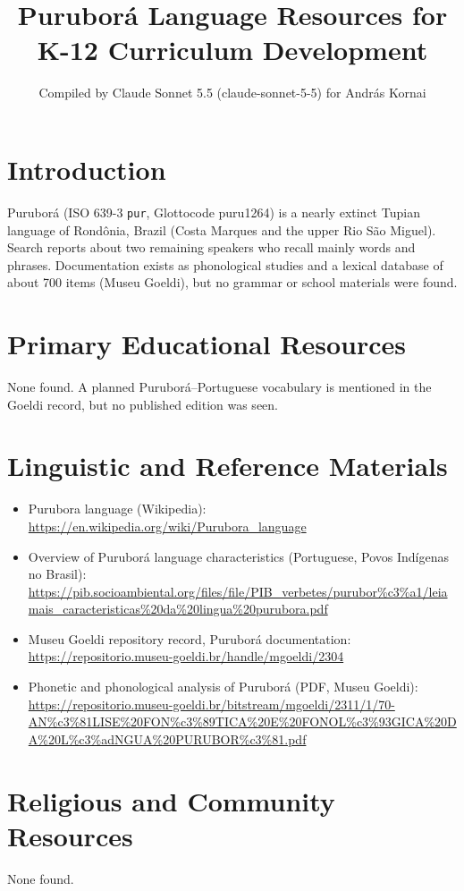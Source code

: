 \documentclass[12pt]{article}
\title{Puruborá Language Resources for K-12 Curriculum Development}
\author{Compiled by Claude Sonnet 5.5 (claude-sonnet-5-5) for Andr\'as Kornai}
\date{}
\begin{document}
\maketitle

\section{Introduction}
Puruborá (ISO 639-3 \texttt{pur}, Glottocode puru1264) is a nearly extinct Tupian language of Rondônia, Brazil (Costa Marques and the upper Rio São Miguel). Search reports about two remaining speakers who recall mainly words and phrases. Documentation exists as phonological studies and a lexical database of about 700 items (Museu Goeldi), but no grammar or school materials were found.

\section{Primary Educational Resources}
None found. A planned Puruborá--Portuguese vocabulary is mentioned in the Goeldi record, but no published edition was seen.

\section{Linguistic and Reference Materials}
\begin{itemize}
\item Purubora language (Wikipedia): \url{https://en.wikipedia.org/wiki/Purubora_language}
\item Overview of Puruborá language characteristics (Portuguese, Povos Ind\'igenas no Brasil): \url{https://pib.socioambiental.org/files/file/PIB_verbetes/purubor%c3%a1/leiamais_caracteristicas%20da%20lingua%20purubora.pdf}
\item Museu Goeldi repository record, Puruborá documentation: \url{https://repositorio.museu-goeldi.br/handle/mgoeldi/2304}
\item Phonetic and phonological analysis of Puruborá (PDF, Museu Goeldi): \url{https://repositorio.museu-goeldi.br/bitstream/mgoeldi/2311/1/70-AN%c3%81LISE%20FON%c3%89TICA%20E%20FONOL%c3%93GICA%20DA%20L%c3%adNGUA%20PURUBOR%c3%81.pdf}
\end{itemize}

\section{Religious and Community Resources}
None found.
\end{document}
